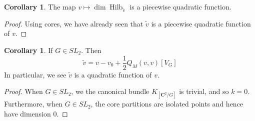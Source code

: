 \documentclass{amsart}[12pt]
\theoremstyle{definition}
\newtheorem{corollary}[dummy]{Corollary}
\newcommand{\C}{\mathbf{C}}
\DeclareMathOperator{\Hilb}{Hilb}
\begin{document}
\begin{corollary}
The map $v\mapsto \dim\Hilb_{\tilde{v}}$ is a piecewise quadratic function.
\end{corollary}

\begin{proof}
Using cores, we have already seen that $\tilde{v}$ is a piecewise quadratic function of $v$.  
\end{proof}


\begin{corollary}  If $G\in SL_2$. Then
$$\tilde{v}=v-v_0+\frac{1}{2}Q_M(v,v)[V_G]$$
In particular, we see $\tilde{v}$ is a quadratic function of $v$.
\end{corollary}

\begin{proof}
When $G\in SL_2$, we the canonical bundle $K_{[\C^2/G]}$ is trivial, and so $k=0$.  Furthermore, when $G\in SL_2$, the core partitions are isolated points and hence have dimension 0.
\end{proof}












\end{document}
